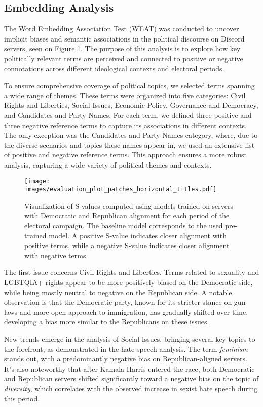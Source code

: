 \subsection{Embedding Analysis}

The Word Embedding Association Test (WEAT) was conducted to uncover implicit biases and semantic associations in the political discourse on Discord servers, seen on Figure \ref{fig:weat}. The purpose of this analysis is to explore how key politically relevant terms are perceived and connected to positive or negative connotations across different ideological contexts and electoral periods.

To ensure comprehensive coverage of political topics, we selected terms spanning a wide range of themes. These terms were organized into five categories: Civil Rights and Liberties, Social Issues, Economic Policy, Governance and Democracy, and Candidates and Party Names. For each term, we defined three positive and three negative reference terms to capture its associations in different contexts. The only exception was the Candidates and Party Names category, where, due to the diverse scenarios and topics these names appear in, we used an extensive list of positive and negative reference terms. This approach ensures a more robust analysis, capturing a wide variety of political themes and contexts.

\begin{figure}[h]
    \centering
    \texttt{[image: images/evaluation\_plot\_patches\_horizontal\_titles.pdf]}
    \caption{Visualization of S-values computed using models trained on servers with Democratic and Republican alignment for each period of the electoral campaign. The baseline model corresponds to the used pre-trained model. A positive S-value indicates closer alignment with positive terms, while a negative S-value indicates closer alignment with negative terms. }
    \label{fig:weat}
\end{figure}

The first issue concerns Civil Rights and Liberties. Terms related to sexuality and LGBTQIA+ rights appear to be more positively biased on the Democratic side, while being mostly neutral to negative on the Republican side. A notable observation is that the Democratic party, known for its stricter stance on gun laws and more open approach to immigration, has gradually shifted over time, developing a bias more similar to the Republicans on these issues.

New trends emerge in the analysis of Social Issues, bringing several key topics to the forefront, as demonstrated in the hate speech analysis. The term \textit{feminism} stands out, with a predominantly negative bias on Republican-aligned servers. It’s also noteworthy that after Kamala Harris entered the race, both Democratic and Republican servers shifted significantly toward a negative bias on the topic of \textit{diversity}, which correlates with the observed increase in sexist hate speech during this period.

